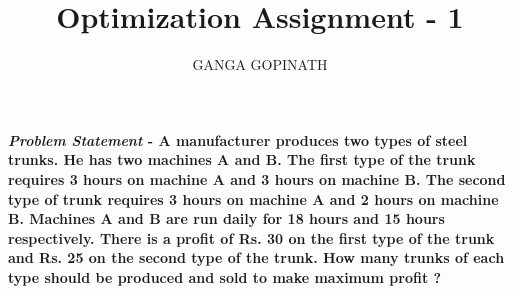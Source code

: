 \documentclass[10pt,twocolumn]{article}
\title{\textbf{Optimization Assignment - 1}}
\author{GANGA GOPINATH}
\begin{document}
\maketitle
\paragraph{\textit{Problem Statement} - A manufacturer produces two types of steel trunks. He has two machines A and
B. The first type of the trunk requires 3 hours on machine A and 3 hours on machine B. The second type of trunk requires 3 hours on machine A and 2 hours on machine B. Machines A and B are run daily for 18 hours and 15 hours respectively. There is a profit of Rs. 30 on the first type of the trunk and Rs. 25 on the second type of the trunk. How many trunks of each type
should be produced and sold to make maximum profit ?} 
\end{document}
